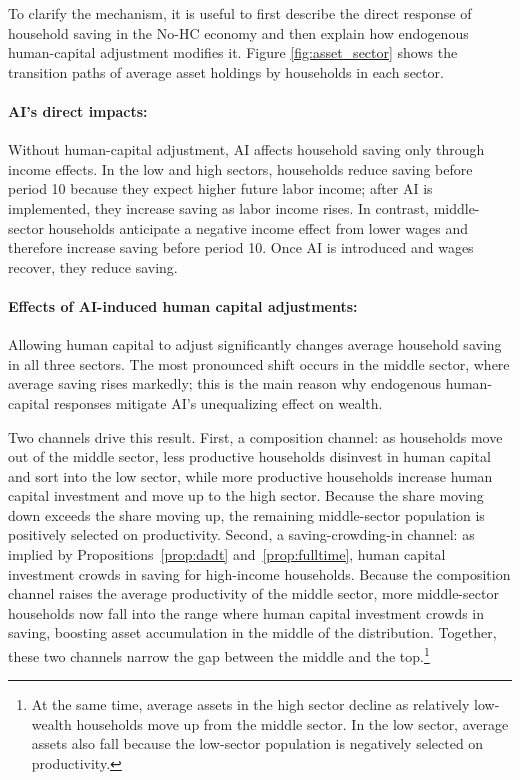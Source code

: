 \documentclass[12pt,english]{article}
\numberwithin{equation}{section}
\begin{document}
To clarify the mechanism, it is useful to first describe the direct response of household saving in the No-HC economy and then explain how endogenous human-capital adjustment modifies it. Figure \ref{fig:asset_sector} shows the transition paths of average asset holdings by households in each sector.

\paragraph{AI's direct impacts:} Without human-capital adjustment, AI affects household saving only through income effects. In the low and high sectors, households reduce saving before period 10 because they expect higher future labor income; after AI is implemented, they increase saving as labor income rises. In contrast, middle-sector households anticipate a negative income effect from lower wages and therefore increase saving before period 10. Once AI is introduced and wages recover, they reduce saving.

\paragraph{Effects of AI-induced human capital adjustments:}


Allowing human capital to adjust significantly changes average household saving in all three sectors. The most pronounced shift occurs in the middle sector, where average saving rises markedly; this is the main reason why endogenous human-capital responses mitigate AI’s unequalizing effect on wealth.

Two channels drive this result. First, a composition channel: as households move out of the middle sector, less productive households disinvest in human capital and sort into the low sector, while more productive households increase human capital investment and move up to the high sector. Because the share moving down exceeds the share moving up, the remaining middle-sector population is positively selected on productivity. Second, a saving-crowding-in channel: as implied by Propositions~\ref{prop:dadt} and~\ref{prop:fulltime}, human capital investment crowds in saving for high-income households. Because the composition channel raises the average productivity of the middle sector, more middle-sector households now fall into the range where human capital investment crowds in saving, boosting asset accumulation in the middle of the distribution. Together, these two channels narrow the gap between the middle and the top.\footnote{At the same time, average assets in the high sector decline as relatively low-wealth households move up from the middle sector. In the low sector, average assets also fall because the low-sector population is negatively selected on productivity.}
\end{document}
